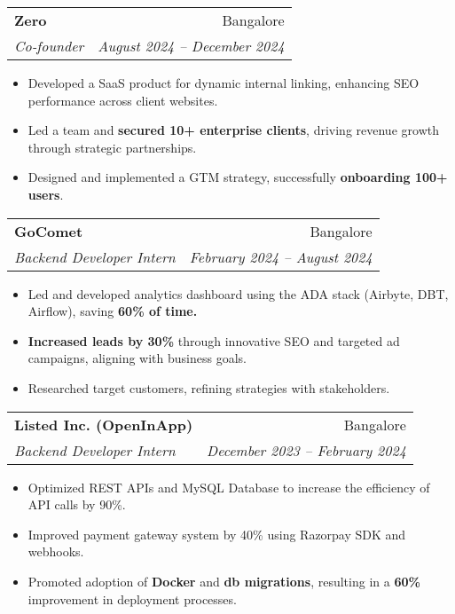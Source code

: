 \documentclass[letterpaper,11pt]{article}
\makeatletter
\newcommand{\resumeItem}[1]{
  \item\small{
    {#1 \vspace{-2pt}}
  }
}
\newcommand{\resumeSubheading}[4]{
  \vspace{-2pt}\item
    \begin{tabular*}{0.97\textwidth}[t]{l@{\extracolsep{\fill}}r}
      \textbf{#1} & #2 \\
      \textit{\small#3} & \textit{\small #4} \\
    \end{tabular*}\vspace{-7pt}
}
\newcommand{\resumeItemListStart}{\begin{itemize}}
\newcommand{\resumeItemListEnd}{\end{itemize}\vspace{-5pt}}
\makeatother
\begin{document}
    \resumeSubheading
    {Zero}{Bangalore}
    {Co-founder}{August 2024 -- December 2024}
        \resumeItemListStart
            \resumeItem{Developed a SaaS product for dynamic internal linking, enhancing SEO performance across client websites.}
            \resumeItem{Led a team and \textbf{secured 10+ enterprise clients}, driving revenue growth through strategic partnerships.}
            \resumeItem{Designed and implemented a GTM strategy, successfully \textbf{onboarding 100+ users}.}
        \resumeItemListEnd

    \resumeSubheading
    {GoComet}{Bangalore}
    {Backend Developer Intern}{February 2024 -- August 2024}
        \resumeItemListStart
            \resumeItem{Led and developed analytics dashboard using the ADA stack (Airbyte, DBT, Airflow), saving \textbf{60\% of time.}}
            \resumeItem{\textbf{Increased leads by 30\%} through innovative SEO and targeted ad campaigns, aligning with business goals.}
            \resumeItem{Researched target customers, refining strategies with stakeholders.}
        \resumeItemListEnd

    \resumeSubheading
    {Listed Inc. (OpenInApp)}{Bangalore}
    {Backend Developer Intern}{December 2023 -- February 2024}
        \resumeItemListStart
            \resumeItem{Optimized REST APIs and MySQL Database to increase the efficiency of API calls by 90\%.}
            \resumeItem{Improved payment gateway system by 40\% using Razorpay SDK and webhooks.}
            \resumeItem{Promoted adoption of \textbf{Docker} and \textbf{db migrations}, resulting in a \textbf{60\%} improvement in deployment processes.}
        \resumeItemListEnd

        
    
       
\end{document}
